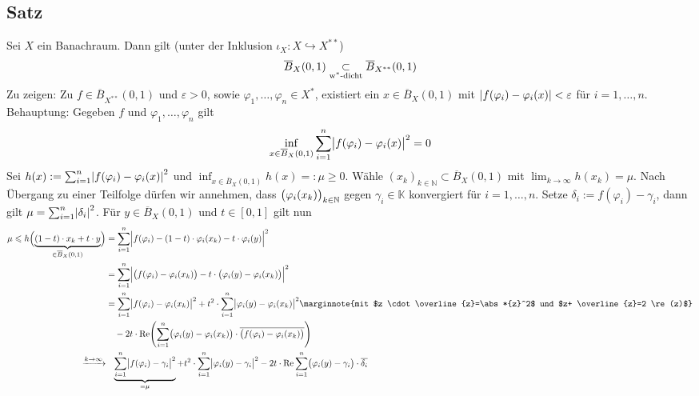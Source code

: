 \subsection[Satz: Einheitskugel eines Banachraumes $X$ liegt $\w^*$-dicht in Einheitskugel von $X^{**}$]{Satz} %
\label{sub:516}
Sei $X$ ein Banachraum. Dann gilt (unter der Inklusion $\iota_X \colon X \hookrightarrow X^{**}$)
\[
	\overline{B}_X(0,1) \underset{\text{$\w^*$-dicht}}{\subset} \overline{B}_{X^{**}}(0,1)
\]
Zu zeigen: Zu $f \in \overline{B}_{X^{**}}(0,1)$ und $\varepsilon>0$, sowie $\varphi_1, \ldots , \varphi_n \in X^*$, existiert ein $x \in \overline{B}_X(0,1)$ mit
$\abs*{f(\varphi_i)- \varphi_i(x)} < \varepsilon$ für $i=1,\ldots ,n$. Behauptung: Gegeben $f$ und $\varphi_1, \ldots , \varphi_n$ gilt
\[
	\inf_{x \in \overline{B}_X(0,1)} \sum_{i=1}^{n} \abs[\big]{f(\varphi_i)- \varphi_i(x)}^2 = 0
\]
Sei $h(x) := \sum_{i=1}^{n} \abs*{f(\varphi_i)- \varphi_i(x)}^2 $ und $\inf_{x\in \overline{B}_X(0,1)} h(x) =: \mu \ge 0$. Wähle 
$(x_k)_{k \in \mathds{N}} \subset \overline{B}_X(0,1)$ mit $\lim_{k \to \infty} h(x_k)= \mu$. Nach Übergang zu einer Teilfolge dürfen wir annehmen, dass 
$\enbrace[\big]{\varphi_i(x_k)}_{k \in \mathds{N}}$ gegen  $\gamma_i \in \mathds{K}$ konvergiert für $i=1,\ldots ,n$. Setze $\delta_i := f(\varphi_i) -\gamma_i$, dann
gilt $\mu = \sum_{i=1}^{n} \abs*{\delta_i}^2$. Für $y \in \overline{B}_X(0,1)$ und $t \in [0,1]$ gilt nun
\begin{align*}
	\mu \le h\enbrace[\Big]{\underbrace{(1-t) \cdot x_k + t \cdot y}_{\in \overline{B}_X(0,1)}} &= 
	\sum_{i=1}^{n} \abs[\Big]{f(\varphi_i)- (1-t) \cdot \varphi_i(x_k) - t \cdot \varphi_i(y)}^2 \\
	&= \sum_{i=1}^{n} \abs[\Big]{\enbrace[\big]{f(\varphi_i)- \varphi_i(x_k)} - t \cdot  \enbrace[\big]{\varphi_i(y)- \varphi_i(x_k)} }^2 \\
	&= \sum_{i=1}^{n} \abs[\big]{f(\varphi_i)- \varphi_i(x_k)}^2 + t^2 \cdot \sum_{i=1}^{n} \abs[\big]{\varphi_i(y)- \varphi_i(x_k)}^2 \marginnote{mit $z \cdot 
	\overline{z}=\abs*{z}^2$ und $z+ \overline{z}=2 \re(z)$}\\
	& \quad - 2 t \cdot \re \enbrace*{\sum_{i=1}^{n} \enbrace[\big]{\varphi_i(y)- \varphi_i(x_k)} \cdot \overline{\enbrace[\big]{f(\varphi_i)- \varphi_i(x_k)} }} \\
	\xrightarrow{k \to \infty} &\hphantom{=} \underbrace{\sum_{i=1}^{n} \abs[\big]{f(\varphi_i)- \gamma_i}^2}_{=\mu} + t^2 \cdot \sum_{i=1}^{n} \abs[\big]{\varphi_i(y)- \gamma_i}^2  
	-2 t \cdot \re \sum_{i=1}^{n} \enbrace[\big]{\varphi_i(y)- \gamma_i} \cdot \overline{\delta_i }
\end{align*}
